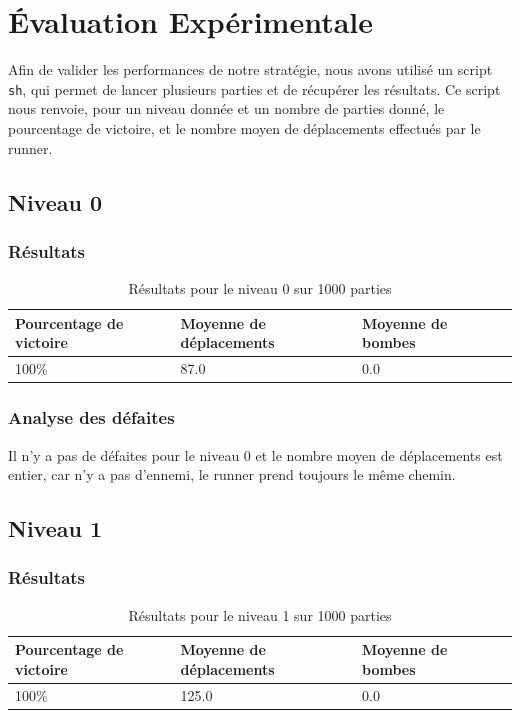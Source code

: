 \chapter{Évaluation Expérimentale}
\label{cp:evaluation}

Afin de valider les performances de notre stratégie, nous avons utilisé un script \texttt{sh}, qui permet de lancer plusieurs parties et de récupérer les résultats.
Ce script nous renvoie, pour un niveau donnée et un nombre de parties donné, le pourcentage de victoire, et le nombre moyen de déplacements effectués par le runner.

\section{Niveau 0}

\subsection{Résultats}

\begin{table}[!htpb]
    \begin{tabularx}{\textwidth}{lXXX}
        \toprule
        Pourcentage de victoire & Moyenne de déplacements & Moyenne de bombes \\
        \midrule
        100\% & 87.0 & 0.0 \\
        \bottomrule
    \end{tabularx}
    \caption{Résultats pour le niveau 0 sur 1000 parties}
    \label{tab:res-niveau-0}
\end{table}

\subsection{Analyse des défaites}

Il n'y a pas de défaites pour le niveau 0 et le nombre moyen de déplacements est entier, car n'y a pas d'ennemi, le runner prend toujours le même chemin.

\section{Niveau 1}

\subsection{Résultats}

\begin{table}[!htpb]
    \begin{tabularx}{\textwidth}{lXXX}
        \toprule
        Pourcentage de victoire & Moyenne de déplacements & Moyenne de bombes \\
        \midrule
        100\% & 125.0 & 0.0 \\
        \bottomrule
    \end{tabularx}
    \caption{Résultats pour le niveau 1 sur 1000 parties}
    \label{tab:res-niveau-1}
\end{table}

